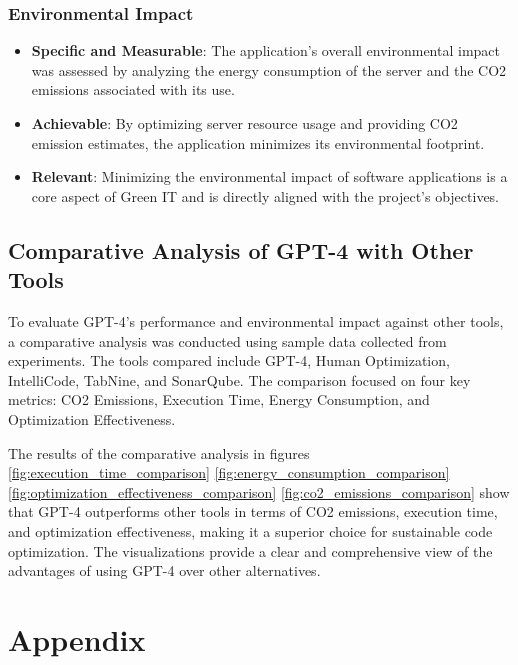 \documentclass[conference,compsoc]{IEEEtran}
\begin{document}
\subsubsection{Environmental Impact}
\begin {itemize}
\item \textbf{Specific and Measurable}: The application's overall environmental impact was assessed by analyzing the energy consumption of the server and the CO2 emissions associated with its use.

\item \textbf{Achievable}: By optimizing server resource usage and providing CO2 emission estimates, the application minimizes its environmental footprint.

\item \textbf{Relevant}: Minimizing the environmental impact of software applications is a core aspect of Green IT and is directly aligned with the project's objectives.
\end {itemize}

\subsection{Comparative Analysis of GPT-4 with Other Tools}
To evaluate GPT-4's performance and environmental impact against other tools, a comparative analysis was conducted using sample data collected from experiments. The tools compared include GPT-4, Human Optimization, IntelliCode, TabNine, and SonarQube. The comparison focused on four key metrics: CO2 Emissions, Execution Time, Energy Consumption, and Optimization Effectiveness.


The results of the comparative analysis in figures \ref{fig:execution_time_comparison} \ref{fig:energy_consumption_comparison} \ref{fig:optimization_effectiveness_comparison} \ref{fig:co2_emissions_comparison} show that GPT-4 outperforms other tools in terms of CO2 emissions, execution time, and optimization effectiveness, making it a superior choice for sustainable code optimization. The visualizations provide a clear and comprehensive view of the advantages of using GPT-4 over other alternatives.

\cleardoublepage
\section*{Appendix}
\end{document}
